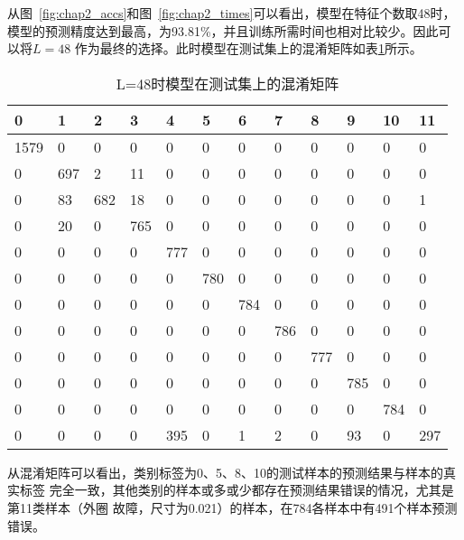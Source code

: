 从图~\ref{fig:chap2_accs}和图~\ref{fig:chap2_times}可以看出，模型在特征个数取48时，
模型的预测精度达到最高，为93.81\%，并且训练所需时间也相对比较少。因此可以将$L=48$
作为最终的选择。此时模型在测试集上的混淆矩阵如表\ref{tab:chap2:confusion_matrix}所示。
\begin{table}[htb]
  \centering
  \begin{minipage}[t]{0.9\linewidth} %
  \caption{L=48时模型在测试集上的混淆矩阵}
  \label{tab:chap2:confusion_matrix}
    \begin{tabularx}{\linewidth}{XXXXXXXXXXXX}
      \toprule[1.5pt]
         0 &   1 &   2 &   3 &   4 &   5 &   6 &   7 &   8 &   9 &  10 &  11 \\\midrule[1pt]
      1579 &   0 &   0 &   0 &   0 &   0 &   0 &   0 &   0 &   0 &   0 &   0 \\
         0 & 697 &   2 &  11 &   0 &   0 &   0 &   0 &   0 &   0 &   0 &   0 \\
         0 &  83 & 682 &  18 &   0 &   0 &   0 &   0 &   0 &   0 &   0 &   1 \\
         0 &  20 &   0 & 765 &   0 &   0 &   0 &   0 &   0 &   0 &   0 &   0 \\
         0 &   0 &   0 &   0 & 777 &   0 &   0 &   0 &   0 &   0 &   0 &   0 \\
         0 &   0 &   0 &   0 &   0 & 780 &   0 &   0 &   0 &   0 &   0 &   0 \\
         0 &   0 &   0 &   0 &   0 &   0 & 784 &   0 &   0 &   0 &   0 &   0 \\
         0 &   0 &   0 &   0 &   0 &   0 &   0 & 786 &   0 &   0 &   0 &   0 \\
         0 &   0 &   0 &   0 &   0 &   0 &   0 &   0 & 777 &   0 &   0 &   0 \\
         0 &   0 &   0 &   0 &   0 &   0 &   0 &   0 &   0 & 785 &   0 &   0 \\
         0 &   0 &   0 &   0 &   0 &   0 &   0 &   0 &   0 &   0 & 784 &   0 \\
         0 &   0 &   0 &   0 & 395 &   0 &   1 &   2 &   0 &  93 &   0 & 297 \\
      \bottomrule[1.5pt]
    \end{tabularx}
  \end{minipage}
\end{table}

从混淆矩阵可以看出，类别标签为0、5、8、10的测试样本的预测结果与样本的真实标签
完全一致，其他类别的样本或多或少都存在预测结果错误的情况，尤其是第11类样本（外圈
故障，尺寸为0.021）的样本，在784各样本中有491个样本预测错误。

